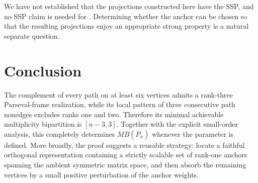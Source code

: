 \documentclass[11pt]{article}
\theoremstyle{remark}
\begin{document}
We have not established that the projections constructed here have the
SSP, and no SSP claim is needed for .  Determining whether
the anchor can be chosen so that the resulting projections enjoy an
appropriate strong property is a natural separate question.

\section{Conclusion}

The complement of every path on at least six vertices admits a rank-three
Parseval-frame realization, while its local pattern of three consecutive
path nonedges excludes ranks one and two.  Therefore its minimal
achievable multiplicity bipartition is $[n-3,3]$.  Together with the explicit
small-order analysis, this completely determines $MB(\overline{P_n})$
whenever the parameter is defined.  More broadly, the proof suggests a
reusable strategy: locate a faithful orthogonal representation containing a
strictly scalable set of rank-one anchors spanning the ambient symmetric
matrix space, and then absorb the remaining vertices by a small positive
perturbation of the anchor weights.



\end{document}
